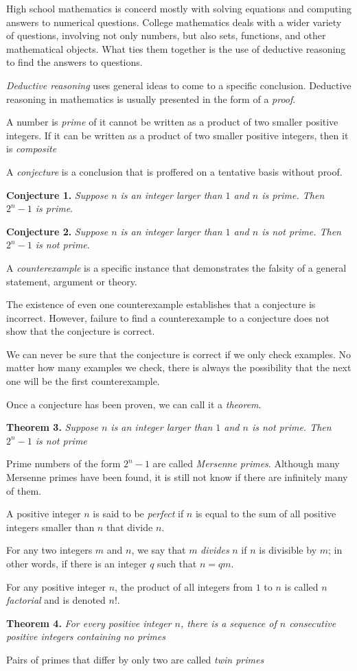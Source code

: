 High school mathematics is concerd mostly with solving equations and computing answers to numerical questions. College mathematics deals with a wider variety of questions, involving not only numbers, but also sets, functions, and other mathematical objects. What ties them together is the use of deductive reasoning to find the answers to questions.

\textit{Deductive reasoning} uses general ideas to come to a specific conclusion. Deductive reasoning in mathematics is usually presented in the form of a \textit{proof}.

A number is \textit{prime} of it cannot be written as a product of two smaller positive integers. If it can be written as a product of two smaller positive integers, then it is \textit{composite}

A \textit{conjecture} is a conclusion that is proffered on a tentative basis without proof.

\textbf{Conjecture 1.} \textit{Suppose \(n\) is an integer larger than \(1\) and \(n\) is prime. Then \(2^n - 1\) is prime}.

\textbf{Conjecture 2.} \textit{Suppose \(n\) is an integer larger than \(1\) and \(n\) is not prime. Then \(2^n - 1\) is not prime}.

A \textit{counterexample} is a specific instance that demonstrates the falsity of a general statement, argument or theory.

The existence of even one counterexample establishes that a conjecture is incorrect. However, failure to find a counterexample to a conjecture does not show that the conjecture is correct.

We can never be sure that the conjecture is correct if we only check examples. No matter how many examples we check, there is always the possibility that the next one will be the first counterexample.

Once a conjecture has been proven, we can call it a \textit{theorem}.

\textbf{Theorem 3.} \textit{Suppose \(n\) is an integer larger than \(1\) and \(n\) is not prime. Then \(2^n - 1\) is not prime}

Prime numbers of the form \(2^n -1\) are called \textit{Mersenne primes}. Although many Mersenne primes have been found, it is still not know if there are infinitely many of them.

A positive integer \(n\) is said to be \textit{perfect} if \(n\) is equal to the sum of all positive integers smaller than \(n\) that divide  \(n\).

For any two integers \(m\) and \(n\), we say that \(m\) \textit{divides} \(n\) if \(n\) is divisible by \(m\); in other words, if there is an integer \(q\) such that \(n=qm\).

For any positive integer \(n\), the product of all integers from \(1\) to \(n\) is called \(n\) \textit{factorial} and is denoted \(n!\).

\textbf{Theorem 4.} \textit{For every positive integer \(n\), there is a sequence of \(n\) consecutive positive integers containing no primes}

Pairs of primes that differ by only two are called \textit{twin primes}
